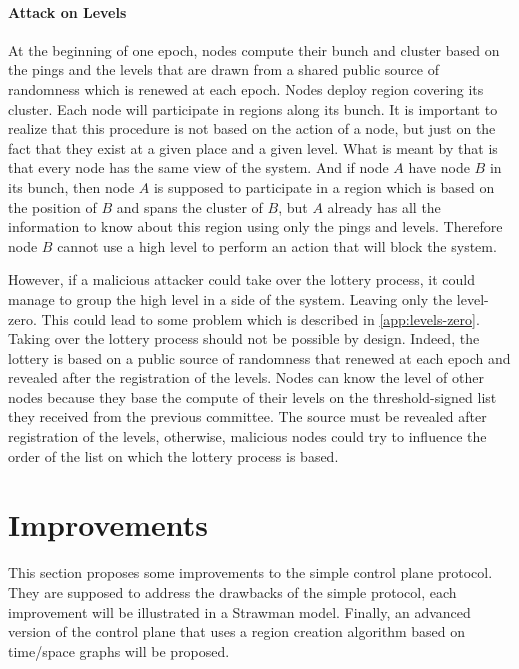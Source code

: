 \documentclass[a4paper,11pt,oneside]{report}
\begin{document}
\subsubsection{Attack on Levels} \label{sec:ControlePlane-Threat-Model}
At the beginning of one epoch, nodes compute their bunch and cluster based on
the pings and the levels that are drawn from a shared public source of randomness
which is renewed at each epoch. Nodes deploy region covering its cluster. Each
node will participate in regions along its bunch. It is important to realize that this procedure is
not based on the action of a node, but just on the fact that they exist at a
given place and a given level. What is meant by that is that every node has
the same view of the system. And if node $A$ have node $B$ in its bunch, then
node $A$ is supposed to participate in a region which is based on the position
of $B$ and spans the cluster of $B$, but $A$ already has all the information
to know about this region using only the pings and levels. Therefore node $B$
cannot use a high level to perform an action that will block the system. 

However, if a malicious attacker could take over the lottery process, it could
manage to group the high level in a side of the system. Leaving only the
level-zero. This could lead to some problem which is described in \autoref{app:levels-zero}.
Taking over the lottery process should not be possible by design. Indeed, the
lottery is based on a public source of randomness that renewed at each epoch
and revealed after the registration of the levels. Nodes can know the level of
other nodes because they base the compute of their levels on the
threshold-signed list they received from the previous committee. The source must be revealed after registration of the levels,
otherwise, malicious nodes could try to influence the order of the list on which
the lottery process is based. 

\chapter{Improvements} \label{chap:Improvements} %

This section proposes some improvements to the simple control plane protocol. They
are supposed to address the drawbacks of the simple protocol, each improvement
will be illustrated in a Strawman model. Finally, an advanced
version of the control plane that uses a region creation algorithm based on
time/space graphs will be proposed. 
\end{document}
